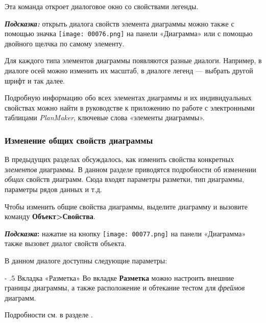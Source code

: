 ﻿\documentclass[a4paper,10pt]{article}
\makeatletter
\renewcommand\paragraph{%
   \@startsection{paragraph}{4}{0mm}%
      {-\baselineskip}%
      {.5\baselineskip}%
      {\normalfont\normalsize\bfseries}}
\makeatother
\begin{document}
Эта команда откроет диалоговое окно со свойствами легенды.

\begin{mdframed}[backgroundcolor=blue!10]
\textbf{\textit{Подсказка:}} открыть диалога свойств элемента диаграммы можно также с помощью значка \texttt{[image: 00076.png]} на панели «Диаграмма» или с помощью двойного щелчка по самому элементу.
\end{mdframed}

Для каждого типа элементов диаграммы появляются разные диалоги. Например, в диалоге осей можно изменить их масштаб, в диалоге легенд — выбрать другой шрифт и так далее.

\begin{mdframed}[backgroundcolor=blue!10]
Подробную информацию обо всех элементах диаграммы и их индивидуальных свойствах можно найти в руководстве к приложению по работе с электронными таблицами \textit{PlanMaker}, ключевые слова «элементы диаграммы».
\end{mdframed}

\subsubsection{Изменение общих свойств диаграммы}
В предыдущих разделах обсуждалось, как изменить свойства конкретных \textit{элементов} диаграммы. В данном разделе приводятся подробности об изменении \textit{общих} свойств диаграмм. Сюда входят параметры разметки, тип диаграммы, параметры рядов данных и т.д.

Чтобы изменить общие свойства диаграммы, выделите диаграмму и вызовите команду \textbf{Объект>Свойства}.

\begin{mdframed}[backgroundcolor=blue!10]
\textbf{\textit{Подсказка}:} нажатие на кнопку \texttt{[image: 00077.png]} на панели «Диаграмма» также вызовет диалог свойств объекта.
\end{mdframed}

В данном диалоге доступны следующие параметры:

\paragraph{Вкладка «Разметка»}
Во вкладке \textbf{Разметка} можно настроить внешние границы диаграммы, а также расположение и обтекание тестом для \textit{фреймов} диаграмм.

Подробности см. в разделе .
\end{document}
